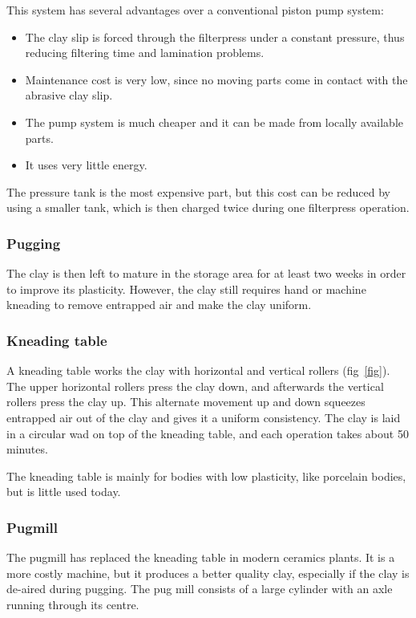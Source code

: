 This system has several advantages over a conventional piston pump system:
\begin{itemize} 
\item The clay slip is forced through the filterpress under a constant 
pressure, thus reducing filtering time and lamination problems.
\item Maintenance cost is very low, since no moving parts come in contact with 
the abrasive clay slip.
\item The pump system is much cheaper and it can be made from locally available 
parts.
\item It uses very little energy.
\end{itemize}
The pressure tank is the most expensive part, but this cost can be reduced by 
using a smaller tank, which is then charged twice during one filterpress 
operation.
\subsubsection{Pugging}
The clay is then left to mature in the storage area for at least two weeks in 
order to improve its plasticity. However, the clay still requires hand or 
machine kneading to remove entrapped air and make the clay uniform.
\subsubsection{Kneading table}
A kneading table works the clay with horizontal and vertical rollers 
(fig~\ref{fig}). The upper horizontal rollers press the clay down, and 
afterwards the vertical rollers press the clay up. This alternate movement up 
and down squeezes entrapped air out of the clay and gives it a uniform 
consistency. The clay is laid in a circular wad on top of the kneading table, 
and each operation takes about 50 minutes.

The kneading table is mainly for bodies with low plasticity, like porcelain 
bodies, but is little used today.
\subsubsection{Pugmill}
The pugmill has replaced the kneading table in modern ceramics plants. It is a 
more costly machine, but it produces a better quality clay, especially if the 
clay is de-aired during pugging. The pug mill consists of a large cylinder with 
an axle running through its centre.

